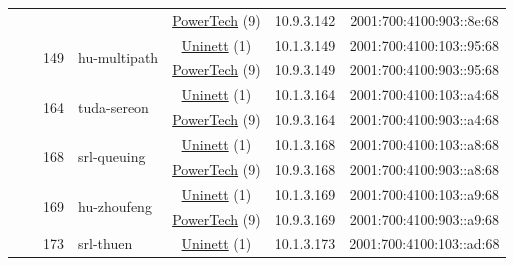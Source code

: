 \begin{small}
\begin{center}
\begin{longtable}{|c|c|c|c|c|c|c|c|}
  &  &  &  & \multicolumn{2}{|c|}{\tiny{\href{http://www.powertech.no}{PowerTech} (9)}} & \tiny{10.9.3.142} & \tiny{2001:700:4100:903::8e:68} \\* \cline{3-3}\cline{4-4}\cline{5-5}\cline{6-6}\cline{7-7}\cline{8-8}
  &  & \multirow{2}{*}{\tiny{149}} & \multicolumn{1}{|l|}{\multirow{2}{*}{\tiny{hu-multipath}}} & \multicolumn{2}{|c|}{\tiny{\href{https://www.uninett.no}{Uninett} (1)}} & \tiny{10.1.3.149} & \tiny{2001:700:4100:103::95:68} \\* \cline{5-5}\cline{6-6}\cline{7-7}\cline{8-8}
  &  &  &  & \multicolumn{2}{|c|}{\tiny{\href{http://www.powertech.no}{PowerTech} (9)}} & \tiny{10.9.3.149} & \tiny{2001:700:4100:903::95:68} \\* \cline{3-3}\cline{4-4}\cline{5-5}\cline{6-6}\cline{7-7}\cline{8-8}
  &  & \multirow{2}{*}{\tiny{164}} & \multicolumn{1}{|l|}{\multirow{2}{*}{\tiny{tuda-sereon}}} & \multicolumn{2}{|c|}{\tiny{\href{https://www.uninett.no}{Uninett} (1)}} & \tiny{10.1.3.164} & \tiny{2001:700:4100:103::a4:68} \\* \cline{5-5}\cline{6-6}\cline{7-7}\cline{8-8}
  &  &  &  & \multicolumn{2}{|c|}{\tiny{\href{http://www.powertech.no}{PowerTech} (9)}} & \tiny{10.9.3.164} & \tiny{2001:700:4100:903::a4:68} \\* \cline{3-3}\cline{4-4}\cline{5-5}\cline{6-6}\cline{7-7}\cline{8-8}
  &  & \multirow{2}{*}{\tiny{168}} & \multicolumn{1}{|l|}{\multirow{2}{*}{\tiny{srl-queuing}}} & \multicolumn{2}{|c|}{\tiny{\href{https://www.uninett.no}{Uninett} (1)}} & \tiny{10.1.3.168} & \tiny{2001:700:4100:103::a8:68} \\* \cline{5-5}\cline{6-6}\cline{7-7}\cline{8-8}
  &  &  &  & \multicolumn{2}{|c|}{\tiny{\href{http://www.powertech.no}{PowerTech} (9)}} & \tiny{10.9.3.168} & \tiny{2001:700:4100:903::a8:68} \\* \cline{3-3}\cline{4-4}\cline{5-5}\cline{6-6}\cline{7-7}\cline{8-8}
  &  & \multirow{2}{*}{\tiny{169}} & \multicolumn{1}{|l|}{\multirow{2}{*}{\tiny{hu-zhoufeng}}} & \multicolumn{2}{|c|}{\tiny{\href{https://www.uninett.no}{Uninett} (1)}} & \tiny{10.1.3.169} & \tiny{2001:700:4100:103::a9:68} \\* \cline{5-5}\cline{6-6}\cline{7-7}\cline{8-8}
  &  &  &  & \multicolumn{2}{|c|}{\tiny{\href{http://www.powertech.no}{PowerTech} (9)}} & \tiny{10.9.3.169} & \tiny{2001:700:4100:903::a9:68} \\* \cline{3-3}\cline{4-4}\cline{5-5}\cline{6-6}\cline{7-7}\cline{8-8}
  &  & \multirow{2}{*}{\tiny{173}} & \multicolumn{1}{|l|}{\multirow{2}{*}{\tiny{srl-thuen}}} & \multicolumn{2}{|c|}{\tiny{\href{https://www.uninett.no}{Uninett} (1)}} & \tiny{10.1.3.173} & \tiny{2001:700:4100:103::ad:68} \\* \cline{5-5}\cline{6-6}\cline{7-7}\cline{8-8}

\end{longtable}
\end{center}
\end{small}
